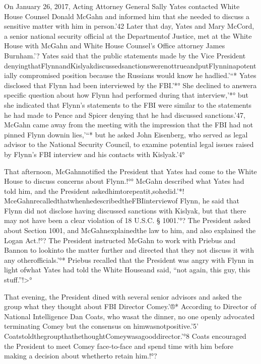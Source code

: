On January 26, 2017, Acting Attorney General Sally Yates contacted White House Counsel Donald McGahn and informed him that she needed to discuss a sensitive matter with him in person.'42
Later that day, Yates and Mary McCord, a senior national security official at the Departmentof Justice, met at the White House with McGahn and White House Counsel’s Office attorney James Burnham.'?
Yates said that the public statements made by the Vice President denyingthatFlynnandKislyakdiscussedsanctionswerenottrueandputFlynninapotentially compromised position because the Russians would know he hadlied.'“*
Yates disclosed that Flynn had been interviewed by the FBI.'*°
She declined to answera specific question about how Flynn had performed during that interview,'*°
but she indicated that Flynn’s statements to the FBI were similar to the statements he had made to Pence and Spicer denying that he had discussed sanctions.'47,
McGahn came away from the meeting with the impression that the FBI had not pinned Flynn downin lies,'“*
but he asked John Eisenberg, who served as legal advisor to the National Security Council, to examine potential legal issues raised by Flynn’s FBI interview and his contacts with Kislyak.'4°

That afternoon, McGahnnotified the President that Yates had come to the White House to discuss concerns about Flynn.!°°
McGahn described what Yates had told him, and the President askedhimtorepeatit,sohedid.'*!
MceGahnrecalledthatwhenhedescribedtheFBIinterviewof Flynn, he said that Flynn did not disclose having discussed sanctions with Kislyak, but that there may not have been a clear violation of 18 U.S.C. § 1001.'°?
The President asked about Section 1001, and McGahnexplainedthe law to him, and also explained the Logan Act.!°?
The President instructed McGahn to work with Priebus and Bannon to lookinto the matter further and directed that they not discuss it with any otherofficials.'°*
Priebus recalled that the President was angry with Flynn in light ofwhat Yates had told the White Houseand said, “not again, this guy, this stuff.”!>°

That evening, the President dined with several senior advisors and asked the group what they thought about FBI Director Comey.'®*
According to Director of National Intelligence Dan Coats, who wasat the dinner, no one openly advocated terminating Comey but the consensus on himwasnotpositive.'5’
CoatstoldthegroupthathethoughtComeywasagooddirector.'°8
Coats encouraged the President to meet Comey face-to-face and spend time with him before making a decision about whetherto retain him.!°?

